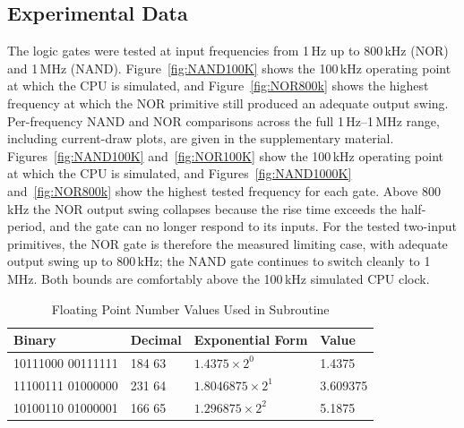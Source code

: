 \subsection{Experimental Data}
The logic gates were tested at input frequencies from 1\,Hz up to 800\,kHz (NOR) and 1\,MHz (NAND).
\ifjxcdc
Figure~\ref{fig:NAND100K} shows the 100\,kHz operating point at which the CPU is simulated, and Figure~\ref{fig:NOR800k} shows the highest frequency at which the NOR primitive still produced an adequate output swing. Per-frequency NAND and NOR comparisons across the full 1\,Hz--1\,MHz range, including current-draw plots, are given in the supplementary material.
\else
Figures~\ref{fig:NAND100K} and~\ref{fig:NOR100K} show the 100\,kHz operating point at which the CPU is simulated, and Figures~\ref{fig:NAND1000K} and~\ref{fig:NOR800k} show the highest tested frequency for each gate.
\fi
Above 800\,kHz the NOR output swing collapses because the rise time exceeds the half-period, and the gate can no longer respond to its inputs. For the tested two-input primitives, the NOR gate is therefore the measured limiting case, with adequate output swing up to 800\,kHz; the NAND gate continues to switch cleanly to 1\,MHz. Both bounds are comfortably above the 100\,kHz simulated CPU clock.

\begin{table}[H]
\centering
\caption{Floating Point Number Values Used in Subroutine}
\label{tab:multiplicationvalues}
\begin{tabular}{@{}llll@{}}
\toprule
Binary & Decimal & Exponential Form & Value\\ \midrule
10111000 00111111 & 184 63 & $1.4375 \times 2^0$ & 1.4375\\
11100111 01000000 & 231 64 & $1.8046875 \times 2^1$ & 3.609375\\
10100110 01000001 & 166 65 & $1.296875 \times 2^2$ & 5.1875\\\bottomrule
\end{tabular}
\end{table}

